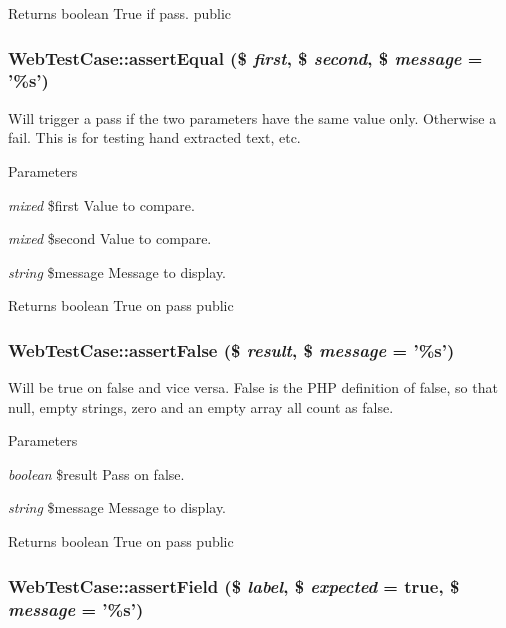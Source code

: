 \begin{DoxyReturn}{Returns}
boolean True if pass.  public 
\end{DoxyReturn}
\hypertarget{class_web_test_case_adb76e8a343c2a422654b3d464e95bf94}{
\subsubsection[{assertEqual}]{\setlength{\rightskip}{0pt plus 5cm}WebTestCase::assertEqual (\$ {\em first}, \/  \$ {\em second}, \/  \$ {\em message} = {\ttfamily '\%s'})}}
\label{class_web_test_case_adb76e8a343c2a422654b3d464e95bf94}
Will trigger a pass if the two parameters have the same value only. Otherwise a fail. This is for testing hand extracted text, etc. 
\begin{DoxyParams}{Parameters}
\item[{\em mixed}]\$first Value to compare. \item[{\em mixed}]\$second Value to compare. \item[{\em string}]\$message Message to display. \end{DoxyParams}
\begin{DoxyReturn}{Returns}
boolean True on pass  public 
\end{DoxyReturn}
\hypertarget{class_web_test_case_a5e382bdb9f868a57664882f71fbff183}{
\subsubsection[{assertFalse}]{\setlength{\rightskip}{0pt plus 5cm}WebTestCase::assertFalse (\$ {\em result}, \/  \$ {\em message} = {\ttfamily '\%s'})}}
\label{class_web_test_case_a5e382bdb9f868a57664882f71fbff183}
Will be true on false and vice versa. False is the PHP definition of false, so that null, empty strings, zero and an empty array all count as false. 
\begin{DoxyParams}{Parameters}
\item[{\em boolean}]\$result Pass on false. \item[{\em string}]\$message Message to display. \end{DoxyParams}
\begin{DoxyReturn}{Returns}
boolean True on pass  public 
\end{DoxyReturn}
\hypertarget{class_web_test_case_a2ff4ade56d51b73cd30290456ee94d74}{
\subsubsection[{assertField}]{\setlength{\rightskip}{0pt plus 5cm}WebTestCase::assertField (\$ {\em label}, \/  \$ {\em expected} = {\ttfamily true}, \/  \$ {\em message} = {\ttfamily '\%s'})}}

